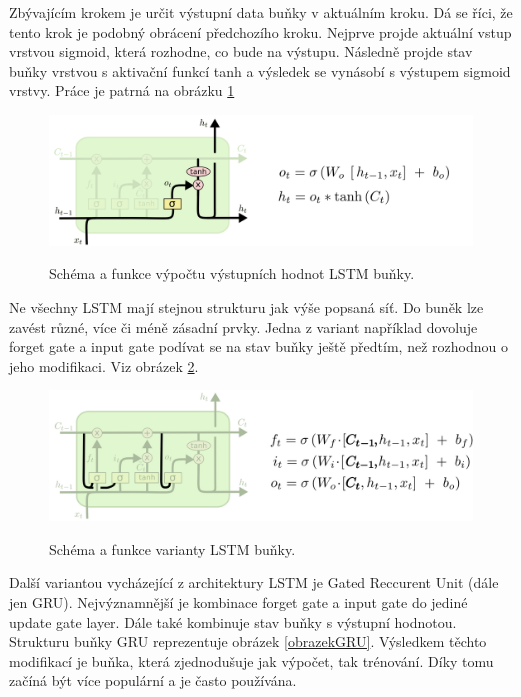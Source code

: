 Zbývajícím krokem je určit výstupní data buňky v aktuálním kroku.
Dá se říci, že tento krok je podobný obrácení předchozího kroku.
Nejprve projde aktuální vstup vrstvou sigmoid, 
která rozhodne, co bude na výstupu.
Následně projde stav buňky vrstvou s aktivační funkcí tanh
a výsledek se vynásobí s výstupem sigmoid vrstvy.\cite{colah_lstm}
Práce je patrná na obrázku \ref{obrazekLSTMOutput}

\begin{figure}[h]\centering
    \centering
    \includegraphics[width=0.8\linewidth]{obrazky/LSTM3-focus-o.png}\\[1pt]  
    \caption{Schéma a funkce výpočtu výstupních hodnot LSTM buňky. \cite{colah_lstm}}    
    \label{obrazekLSTMOutput}
\end{figure}

Ne všechny LSTM mají stejnou strukturu jak výše popsaná síť.
Do buněk lze zavést různé, více či méně zásadní prvky.
Jedna z variant například dovoluje forget gate a input gate
podívat se na stav buňky ještě předtím, 
než rozhodnou o jeho modifikaci.\cite{colah_lstm}
Viz obrázek \ref{obrazekLSTMPeepholes}.

\begin{figure}[h]\centering
    \centering
    \includegraphics[width=0.8\linewidth]{obrazky/LSTM3-var-peepholes.png}\\[1pt]  
    \caption{Schéma a funkce varianty LSTM buňky. \cite{colah_lstm}}    
    \label{obrazekLSTMPeepholes}
\end{figure}

Další variantou vycházející z architektury LSTM
je Gated Reccurent Unit (dále jen GRU).
Nejvýznamnější je kombinace forget gate a input gate 
do jediné update gate layer.
Dále také kombinuje stav buňky s výstupní hodnotou.
Strukturu buňky GRU reprezentuje obrázek \ref{obrazekGRU}.
Výsledkem těchto modifikací je buňka,
která zjednodušuje jak výpočet, tak trénování.
Díky tomu začíná být více populární a je často používána.
\cite{colah_lstm}

